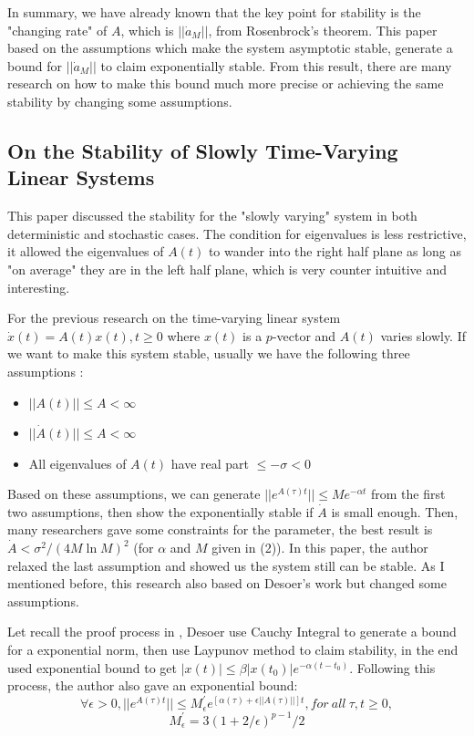 \documentclass{article}
\begin{document}
In summary, we have already known that the key point for stability is the "changing rate" of $A$, which is $||\dot{a}_M||$, from Rosenbrock's theorem. This paper based on the assumptions which make the system asymptotic stable, generate a bound for $||\dot{a}_M||$ to claim exponentially stable. From this result, there are many research on how to make this bound much more precise or achieving the same stability by changing some assumptions. 

\subsection{On the Stability of Slowly Time-Varying Linear Systems\cite{solo1994stability}}

This paper discussed the stability for the "slowly varying" system in both deterministic and stochastic cases. The condition for eigenvalues is less restrictive, it allowed the eigenvalues of $A(t)$ to wander into the right half plane as long as "on average" they are in the left half plane, which is very counter intuitive and interesting.

For the  previous research on the time-varying linear system $\dot{x}(t) = A(t)x(t), t \ge 0$
where $x(t)$ is a $p$-vector and $A(t)$ varies slowly. If we want to make this system stable, usually we have the following three assumptions \cite{rosenbrook1963stability} \cite{desoer1969slowly}:
\begin{itemize}
    \item $||A(t)|| \leq A < \infty$
    \item $||\dot{A}(t)|| \leq A < \infty$
    \item All eigenvalues of $A(t)$ have real part $\leq -\sigma < 0$
\end{itemize}

Based on these assumptions, we can generate $||e^{A(\tau)t}|| \leq M e^{-\alpha t}$ from the first two assumptions, then show the exponentially stable if $\dot{A}$ is small enough. Then, many researchers gave some constraints for the parameter, the best result is $\dot{A} < \sigma^2 / (4M \ln{M})^2$ (for $\alpha$ and $M$ given in (2)). In this paper, the author relaxed the last assumption and showed us the system still can be stable. As I mentioned before, this research also based on Desoer's work \cite{desoer1969slowly} but changed some assumptions.

Let recall the proof process in \cite{desoer1969slowly}, Desoer use Cauchy Integral to generate a bound for a exponential norm, then use Laypunov method to claim stability, in the end used exponential bound to get $|x(t)| \leq \beta |x(t_0)| e^{-\alpha (t-t_0)}$. Following this process, the author also gave an exponential bound:
$$\forall \epsilon > 0, ||e^{A(\tau)t}|| \leq M_{\epsilon}^{'} e^{[\alpha(\tau)+\epsilon ||A(\tau)||]t}, for \ all \ \tau, t \ge 0,$$
$$M_{\epsilon}^{'} = 3(1+2/ \epsilon)^{p-1}/2$$
\end{document}
